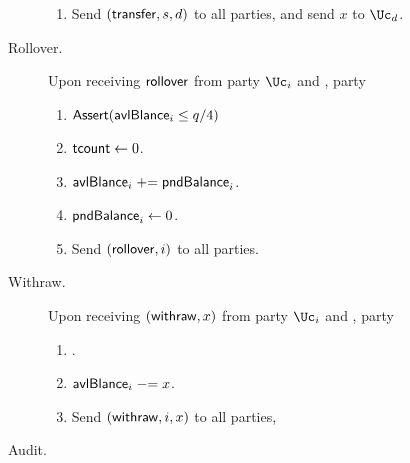 \begin{functionality}
\begin{description}
\begin{enumerate}
		\item Send $(\mathsf{transfer},s,d)$ to all parties, and send $x$ to $\Uc_d$.
			
		\end{enumerate}
		
		\item[Rollover.]     Upon receiving $\mathsf{rollover}$ from  party $\Uc_i$ and \Cc,  party \Cc
		
		\begin{enumerate}
			
			\item $\mathsf{Assert}(\mathsf{avlBlance}_i \le q/4)$
			
			\item $\mathsf{tcount} \leftarrow 0$.
			
			
			\item  $\mathsf{avlBlance}_i  \mathrel{+}= \mathsf{pndBalance}_i$.
			
			\item  $\mathsf{pndBalance}_i  \leftarrow 0$.
			
			
			
			\item  Send $ (\mathsf{rollover},i)$ to all parties.
		\end{enumerate}

		
			\item[Withraw.]     Upon receiving $(\mathsf{withraw},x)$ from  party $\Uc_i$ and \Cc,  party \Cc
		
		\begin{enumerate}
			
			
			 \item \Assert{$x\in (q) \sland \balance_i  \ge x$}.
			
			\item $\mathsf{avlBlance}_i \mathrel{-}= x$.
			
			
			
			\item Send $(\mathsf{withraw},i,x)$ to all parties,
			
		\end{enumerate}
		
		
		
		\item[Audit.]      
		
	\end{description}

\end{functionality}



